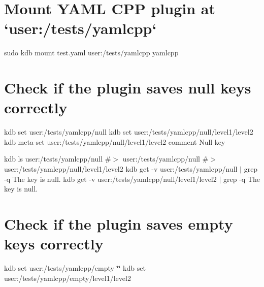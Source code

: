  \hypertarget{autotoc_md807_autotoc_md870}{}\section{Mount Y\+A\+M\+L C\+P\+P plugin at `user\+:/tests/yamlcpp`}\label{autotoc_md807_autotoc_md870}
sudo kdb mount test.\+yaml user\+:/tests/yamlcpp yamlcpp\hypertarget{autotoc_md807_autotoc_md871}{}\section{Check if the plugin saves null keys correctly}\label{autotoc_md807_autotoc_md871}
kdb set user\+:/tests/yamlcpp/null kdb set user\+:/tests/yamlcpp/null/level1/level2 kdb meta-\/set user\+:/tests/yamlcpp/null/level1/level2 comment \textquotesingle{}Null key\textquotesingle{}

kdb ls user\+:/tests/yamlcpp/null \#$>$ user\+:/tests/yamlcpp/null \#$>$ user\+:/tests/yamlcpp/null/level1/level2 kdb get -\/v user\+:/tests/yamlcpp/null $\vert$ grep -\/q \textquotesingle{}The key is null.\textquotesingle{} kdb get -\/v user\+:/tests/yamlcpp/null/level1/level2 $\vert$ grep -\/q \textquotesingle{}The key is null.\textquotesingle{}\hypertarget{autotoc_md807_autotoc_md872}{}\section{Check if the plugin saves empty keys correctly}\label{autotoc_md807_autotoc_md872}
kdb set user\+:/tests/yamlcpp/empty \char`\"{}\char`\"{} kdb set user\+:/tests/yamlcpp/empty/level1/level2

